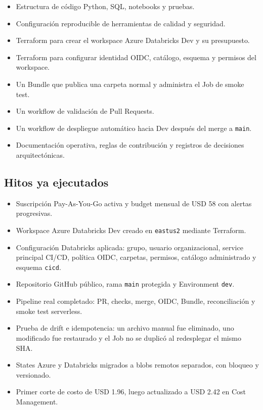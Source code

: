 \documentclass[11pt,a4paper]{article}
\begin{document}
\begin{itemize}
  \item Estructura de código Python, SQL, notebooks y pruebas.
  \item Configuración reproducible de herramientas de calidad y seguridad.
  \item Terraform para crear el workspace Azure Databricks Dev y su presupuesto.
  \item Terraform para configurar identidad OIDC, catálogo, esquema y permisos del workspace.
  \item Un Bundle que publica una carpeta normal y administra el Job de smoke test.
  \item Un workflow de validación de Pull Requests.
  \item Un workflow de despliegue automático hacia Dev después del merge a \texttt{main}.
  \item Documentación operativa, reglas de contribución y registros de decisiones arquitectónicas.
\end{itemize}

\subsection{Hitos ya ejecutados}

\begin{itemize}
  \item Suscripción Pay-As-You-Go activa y budget mensual de USD 58 con alertas progresivas.
  \item Workspace Azure Databricks Dev creado en \texttt{eastus2} mediante Terraform.
  \item Configuración Databricks aplicada: grupo, usuario organizacional, service principal CI/CD,
        política OIDC, carpetas, permisos, catálogo administrado y esquema \texttt{cicd}.
  \item Repositorio GitHub público, rama \texttt{main} protegida y Environment \texttt{dev}.
  \item Pipeline real completado: PR, checks, merge, OIDC, Bundle, reconciliación y smoke test serverless.
  \item Prueba de drift e idempotencia: un archivo manual fue eliminado, uno modificado fue restaurado
        y el Job no se duplicó al redesplegar el mismo SHA.
  \item States Azure y Databricks migrados a blobs remotos separados, con bloqueo y versionado.
  \item Primer corte de costo de USD 1.96, luego actualizado a USD 2.42 en Cost Management.
\end{itemize}
\end{document}
